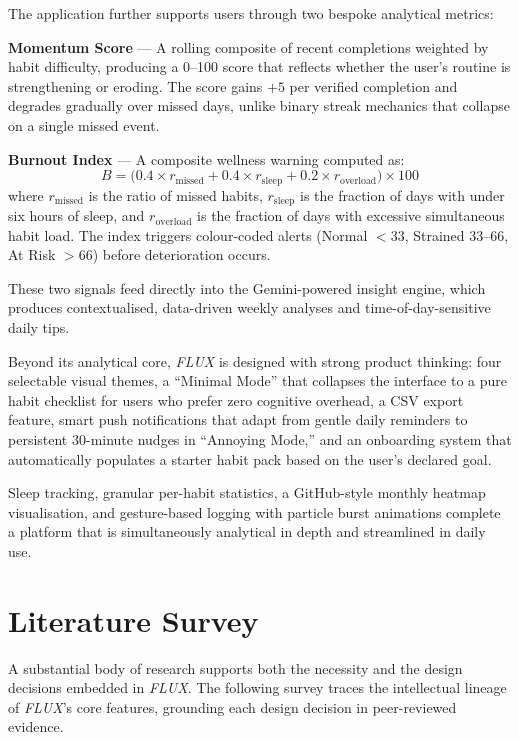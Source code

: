 \documentclass[12pt,a4paper]{article}
\newcommand{\FL}{\textit{FLUX}}
\begin{document}
The application further supports users through two bespoke analytical metrics:

\begin{metricbox}
\textbf{Momentum Score} --- A rolling composite of recent completions weighted by
habit difficulty, producing a 0--100 score that reflects whether the user's routine
is strengthening or eroding. The score gains $+5$ per verified completion and degrades
gradually over missed days, unlike binary streak mechanics that collapse on a single
missed event.

\medskip
\textbf{Burnout Index} --- A composite wellness warning computed as:
\[
B = \bigl(0.4 \times r_{\text{missed}} + 0.4 \times r_{\text{sleep}} + 0.2 \times r_{\text{overload}}\bigr) \times 100
\]
where $r_{\text{missed}}$ is the ratio of missed habits, $r_{\text{sleep}}$ is the
fraction of days with under six hours of sleep, and $r_{\text{overload}}$ is the
fraction of days with excessive simultaneous habit load. The index triggers colour-coded
alerts (Normal $<33$, Strained $33$--$66$, At Risk $>66$) before deterioration occurs.
\end{metricbox}

These two signals feed directly into the Gemini-powered insight engine, which produces
contextualised, data-driven weekly analyses and time-of-day-sensitive daily tips.

Beyond its analytical core, \FL{} is designed with strong product thinking: four
selectable visual themes, a ``Minimal Mode'' that collapses the interface to a
pure habit checklist for users who prefer zero cognitive overhead, a CSV export
feature, smart push notifications that adapt from gentle daily reminders to
persistent 30-minute nudges in ``Annoying Mode,'' and an onboarding system that
automatically populates a starter habit pack based on the user's declared goal.

Sleep tracking, granular per-habit statistics, a GitHub-style monthly heatmap
visualisation, and gesture-based logging with particle burst animations complete
a platform that is simultaneously analytical in depth and streamlined in daily use.

\section{Literature Survey}

A substantial body of research supports both the necessity and the design decisions
embedded in \FL{}. The following survey traces the intellectual lineage of \FL{}'s
core features, grounding each design decision in peer-reviewed evidence.
\end{document}
